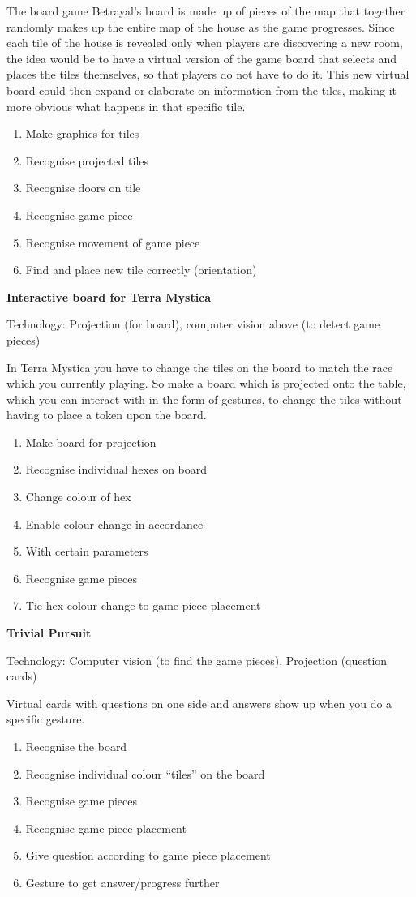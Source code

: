 The board game Betrayal’s board is made up of pieces of the map that together randomly makes up the entire map of the house as the game progresses. Since each tile of the house is revealed only when players are discovering a new room, the idea would be to have a virtual version of the game board that selects and places the tiles themselves, so that players do not have to do it. This new virtual board could then expand or elaborate on information from the tiles, making it more obvious what happens in that specific tile.
\begin{enumerate}
\item Make graphics for tiles
\item Recognise projected tiles
\item Recognise doors on tile
\item Recognise game piece
\item Recognise movement of game piece
\item Find and place new tile correctly (orientation)
\end{enumerate}


\textbf{Interactive board for Terra Mystica} 

Technology: Projection (for board), computer vision above (to detect game pieces)

In Terra Mystica you have to change the tiles on the board to match the race which you currently playing. So make a board which is projected onto the table, which you can interact with in the form of gestures, to change the tiles without having to place a token upon the board.
\begin{enumerate}
\item Make board for projection
\item Recognise individual hexes on board
\item Change colour of hex
\item Enable colour change in accordance \item With certain parameters
\item Recognise game pieces
\item Tie hex colour change to game piece placement
\end{enumerate} 


\textbf{Trivial Pursuit}
 
Technology: Computer vision (to find the game pieces), Projection (question cards)

Virtual cards with questions on one side and answers show up when you do a specific gesture.
\begin{enumerate}
\item Recognise the board
\item Recognise individual colour “tiles” on the board
\item Recognise game pieces
\item Recognise game piece placement 
\item Give question according to game piece placement
\item Gesture to get answer/progress further
\end{enumerate}



